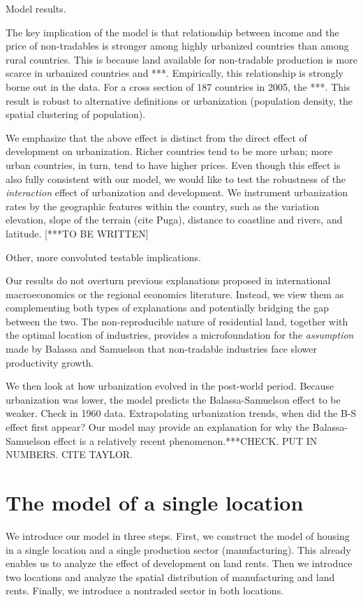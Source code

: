 \documentclass[12pt]{article}
\begin{document}
Model results.

The key implication of the model is that relationship between income and the price of non-tradables is stronger among highly urbanized countries than among rural countries. This is because land available for non-tradable production is more scarce in urbanized countries and ***. Empirically, this relationship is strongly borne out in the data. For a cross section of 187 countries in 2005, the ***. This result is robust to alternative definitions or urbanization (population density, the spatial clustering of population).

We emphasize that the above effect is distinct from the direct effect of development on urbanization. Richer countries tend to be more urban; more urban countries, in turn, tend to have higher prices. Even though this effect is also fully consistent with our model, we would like to test the robustness of the \emph{interaction} effect of urbanization and development. We instrument urbanization rates by the geographic features within the country, such as the variation elevation, slope of the terrain (cite Puga), distance to coastline and rivers, and latitude. [***TO BE WRITTEN]

Other, more convoluted testable implications.

Our results do not overturn previous explanations proposed in international macroeconomics or the regional economics literature. Instead, we view them as complementing both types of explanations and potentially bridging the gap between the two. The non-reproducible nature of residential land, together with the optimal location of industries, provides a microfoundation for the \emph{assumption} made by Balassa and Samuelson that non-tradable industries face slower productivity growth.

We then look at how urbanization evolved in the post-world period. Because urbanization was lower, the model predicts the Balassa-Samuelson effect to be weaker. Check in 1960 data. Extrapolating urbanization trends, when did the B-S effect first appear? Our model may provide an explanation for why the Balassa-Samuelson effect is a relatively recent phenomenon.***CHECK. PUT IN NUMBERS. CITE TAYLOR.


\section{The model of a single location}
We introduce our model in three steps. First, we construct the model of housing in a single location and a single production sector (manufacturing). This already enables us to analyze the effect of development on land rents. Then we introduce two locations and analyze the spatial distribution of manufacturing and land rents. Finally, we introduce a nontraded sector in both locations.
\end{document}
